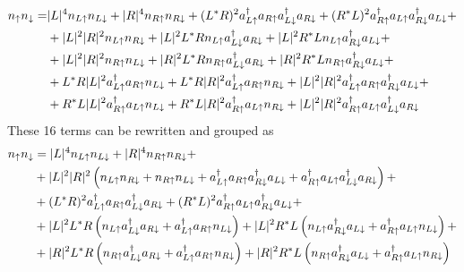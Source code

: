 \begin{equation}
  \begin{split}
    n_\uparrow n_\downarrow =& |L|^4 n_{L\uparrow}n_{L\downarrow}+
     |R|^4 n_{R\uparrow}n_{R\downarrow}+
     (L^*R)^2a^{\dagger}_{L\uparrow}a_{R\uparrow}a^{\dagger}_{L\downarrow}a_{R\downarrow}+
     (R^*L)^2a^{\dagger}_{R\uparrow}a_{L\uparrow}a^{\dagger}_{R\downarrow}a_{L\downarrow}+\\
  &+|L|^2|R|^2 n_{L\uparrow}n_{R\downarrow}+
    |L|^2L^*R n_{L\uparrow}a^{\dagger}_{L\downarrow}a_{R\downarrow}+
    |L|^2R^*L n_{L\uparrow}a^{\dagger}_{R\downarrow}a_{L\downarrow}+\\
  &+|L|^2|R|^2 n_{R\uparrow}n_{L\downarrow}+
    |R|^2L^*R n_{R\uparrow}a^{\dagger}_{L\downarrow}a_{R\downarrow}+
    |R|^2R^*L n_{R\uparrow}a^{\dagger}_{R\downarrow}a_{L\downarrow}+\\
  &+L^*R|L|^2a^{\dagger}_{L\uparrow}a_{R\uparrow}n_{L\downarrow}+
    L^*R|R|^2a^{\dagger}_{L\uparrow}a_{R\uparrow}n_{R\downarrow}+
    |L|^2|R|^2a^{\dagger}_{L\uparrow}a_{R\uparrow}a^{\dagger}_{R\downarrow}a_{L\downarrow}+\\
  &+R^*L|L|^2a^{\dagger}_{R\uparrow}a_{L\uparrow}n_{L\downarrow}+
    R^*L|R|^2a^{\dagger}_{R\uparrow}a_{L\uparrow}n_{R\downarrow}+
    |L|^2|R|^2a^{\dagger}_{R\uparrow}a_{L\uparrow}a^{\dagger}_{L\downarrow}a_{R\downarrow}
  \end{split}
\end{equation}
These 16 terms can be rewritten and grouped as
\begin{equation}
  \begin{split}
    n_\uparrow n_\downarrow&= |L|^4 n_{L\uparrow}n_{L\downarrow}+ |R|^4 n_{R\uparrow}n_{R\downarrow}+\\
  &+|L|^2|R|^2\left(n_{L\uparrow}n_{R\downarrow} + n_{R\uparrow}n_{L\downarrow}+
                    a^{\dagger}_{L\uparrow}a_{R\uparrow}a^{\dagger}_{R\downarrow}a_{L\downarrow}+
                    a^{\dagger}_{R\uparrow}a_{L\uparrow}a^{\dagger}_{L\downarrow}a_{R\downarrow}
              \right)+\\
  &+(L^*R)^2a^{\dagger}_{L\uparrow}a_{R\uparrow}a^{\dagger}_{L\downarrow}a_{R\downarrow}+
     (R^*L)^2a^{\dagger}_{R\uparrow}a_{L\uparrow}a^{\dagger}_{R\downarrow}a_{L\downarrow}+\\
  &+|L|^2L^*R \left(n_{L\uparrow}a^{\dagger}_{L\downarrow}a_{R\downarrow}+
                   a^{\dagger}_{L\uparrow}a_{R\uparrow}n_{L\downarrow}\right)+
    |L|^2R^*L \left(n_{L\uparrow}a^{\dagger}_{R\downarrow}a_{L\downarrow}+
                   a^{\dagger}_{R\uparrow}a_{L\uparrow}n_{L\downarrow}\right)+\\
  &+|R|^2L^*R \left(n_{R\uparrow}a^{\dagger}_{L\downarrow}a_{R\downarrow}+
                   a^{\dagger}_{L\uparrow}a_{R\uparrow}n_{R\downarrow}\right)+
    |R|^2R^*L \left(n_{R\uparrow}a^{\dagger}_{R\downarrow}a_{L\downarrow}+
                   a^{\dagger}_{R\uparrow}a_{L\uparrow}n_{R\downarrow}\right)
  \end{split}
\end{equation}

